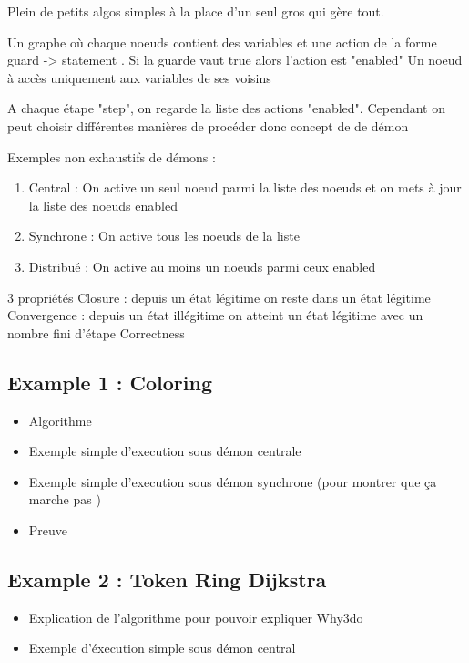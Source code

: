 \documentclass[11pt]{article}
\begin{document}
Plein de petits algos simples à la place d'un seul gros qui gère tout.

Un graphe où chaque noeuds contient des variables et une action de la forme guard -> statement .
Si la guarde vaut true alors l'action est "enabled" 
Un noeud à accès uniquement aux variables de ses voisins 

A chaque étape "step", on regarde la liste des actions "enabled". 
Cependant on peut choisir différentes manières de procéder donc concept de de démon

Exemples non exhaustifs de démons :
\begin{enumerate}
\item Central : On active un seul noeud parmi la liste des noeuds et on mets à jour la liste des noeuds enabled
\item Synchrone : On active tous les noeuds de la liste
\item Distribué : On active au moins un noeuds parmi ceux enabled
\end{enumerate}


3 propriétés
Closure : depuis un état légitime on reste dans un état légitime
Convergence : depuis un état illégitime on atteint un état légitime avec un nombre fini d'étape
Correctness 

\subsection{Example 1 : Coloring}
\label{sec:orge79b9fb}
\begin{itemize}
\item Algorithme
\item Exemple simple d'execution sous démon centrale
\item Exemple simple d'execution sous démon synchrone (pour montrer que ça marche pas )
\item Preuve
\end{itemize}

\subsection{Example 2 : Token Ring Dijkstra}
\label{sec:orgf207761}
\begin{itemize}
\item Explication de l'algorithme pour pouvoir expliquer Why3do
\item Exemple d'éxecution simple sous démon central
\end{itemize}
\end{document}
